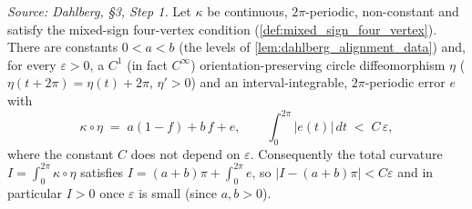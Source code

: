 \begin{theorem}

  \label{thm:exists_preliminary_diffeo}
  \textit{Source: Dahlberg, §3, Step 1.}
  Let $\kappa$ be continuous, $2\pi$-periodic, non-constant and satisfy the
  mixed-sign four-vertex condition (\cref{def:mixed_sign_four_vertex}). There are
  constants $0<a<b$ (the levels
  of \cref{lem:dahlberg_alignment_data}) and, for every $\varepsilon>0$, a $C^1$
  (in fact $C^\infty$) orientation-preserving circle diffeomorphism $\eta$
  ($\eta(t+2\pi)=\eta(t)+2\pi$, $\eta'>0$) and an interval-integrable,
  $2\pi$-periodic error $e$ with
  \[
    \kappa\circ\eta \;=\; a(1-f) + b\,f + e,
    \qquad \int_0^{2\pi} |e(t)|\,dt \;<\; C\,\varepsilon,
  \]
  where the constant $C$ does not depend on $\varepsilon$. Consequently the total
  curvature $I=\int_0^{2\pi}\kappa\circ\eta$ satisfies
  $I = (a+b)\pi + \int_0^{2\pi}e$, so $|I-(a+b)\pi|<C\varepsilon$ and in
  particular $I>0$ once $\varepsilon$ is small (since $a,b>0$).
\end{theorem}
